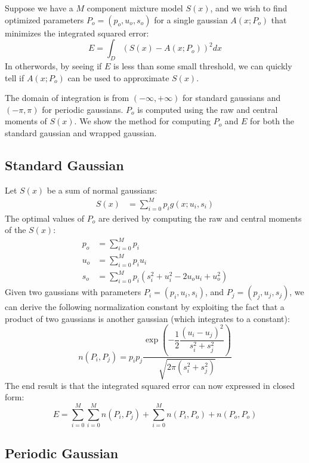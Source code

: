 \documentclass{acm_proc_article-sp}
\begin{document}
Suppose we have a $M$ component mixture model $S(x)$, and we wish to find optimized parameters $P_o = (p_o, u_o, s_o)$ for a single gaussian $A(x; P_o)$ that minimizes the integrated squared error:
\begin{equation}
E = \int_D (S(x)-A(x; P_o))^2 dx
\end{equation}
In otherwords, by seeing if $E$ is less than some small threshold, we can quickly tell if $A(x; P_o)$ can be used to approximate $S(x)$. 

The domain of integration is from $(-\infty,+\infty)$ for standard gaussians and $(-\pi, \pi)$ for periodic gaussians. $P_o$ is computed using the raw and central moments of $S(x)$. We show the method for computing $P_o$ and $E$ for both the standard gaussian and wrapped gaussian. 

\subsection{Standard Gaussian}
Let $S(x)$ be a sum of normal gaussians:
\begin{align}
S(x) &= \sum\limits^{M}_{i=0} p_i g(x; u_i, s_i)
\end{align}
The optimal values of $P_o$ are derived by computing the raw and central moments of the $S(x)$:
\begin{align*}
p_o &= \sum \limits^{M}_{i=0} p_i \\
u_o &= \sum \limits^{M}_{i=0} p_i u_i \\
s_o &= \sum \limits^{M}_{i=0} p_i (s_i^2+u_i^2-2 u_o u_i + u_o^2)
\end{align*}
Given two gaussians with parameters $P_i = (p_i, u_i, s_i)$, and $P_j = (p_j, u_j, s_j)$, we can derive the following normalization constant by exploiting the fact that a product of two gaussians is another gaussian (which integrates to a constant):
\begin{equation}
n(P_i,P_j) = p_i p_j \dfrac{\exp\left(-\dfrac{1}{2} \dfrac{(u_i-u_j)^2}{s_i^2+s_j^2}\right)}{\sqrt{2\pi (s_i^2+s_j^2)}}
\end{equation}
The end result is that the integrated squared error can now expressed in closed form:
\begin{equation}
E = \sum \limits^{M}_{i=0} \sum \limits^{M}_{i=0} n(P_i, P_j) + \sum \limits^{M}_{i=0} n(P_i, P_o) +n(P_o, P_o)
\end{equation}

\subsection{Periodic Gaussian}
\end{document}
